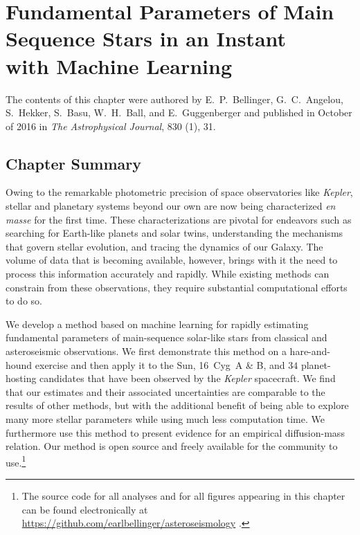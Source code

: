 \chapter{Fundamental Parameters of Main Sequence Stars in an Instant \\with Machine Learning}
\label{chap:ML} 

The contents of this chapter were authored by 
E.~P.~Bellinger, G.~C.~Angelou, S.~Hekker, S.~Basu, W.~H.~Ball, and E.~Guggenberger and published in October of 2016 in \emph{The Astrophysical Journal}, 830 (1), 31. 
\nocite{2016apj...830...31b}

\section*{Chapter Summary}
Owing to the remarkable photometric precision of space observatories like \emph{Kepler}, stellar and planetary systems beyond our own are now being characterized \emph{en masse} for the first time. These characterizations are pivotal for endeavors such as searching for Earth-like planets and solar twins, understanding the mechanisms that govern stellar evolution, and tracing the dynamics of our Galaxy. The volume of data that is becoming available, however, brings with it the need to process this information accurately and rapidly. While existing methods can constrain  from these observations, they require substantial computational efforts to do so. 

We develop a method based on machine learning for rapidly estimating fundamental parameters of main-sequence solar-like stars from classical and asteroseismic observations. We first demonstrate this method on a hare-and-hound exercise and then apply it to the Sun, 16~Cyg~A \& B, and $34$ planet-hosting candidates that have been observed by the \emph{Kepler} spacecraft. We find that our estimates and their associated uncertainties are comparable to the results of other methods, but with the additional benefit of being able to explore many more stellar parameters while using much less computation time. We furthermore use this method to present evidence for an empirical diffusion-mass relation. Our method is open source and freely available for the community to use.\footnote{The source code for all analyses and for all figures appearing in this chapter can be found electronically at \url{https://github.com/earlbellinger/asteroseismology} \citep{earl_bellinger_2016_55400}.}



